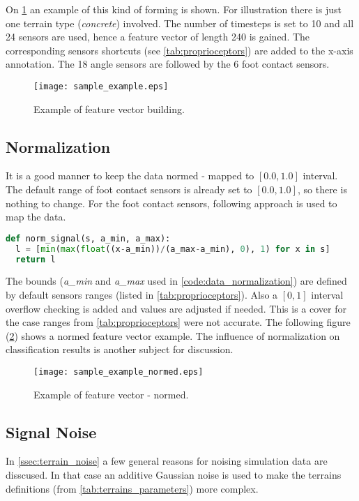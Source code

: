 On \cref{fig:sample_example} an example of this kind of forming is shown. For illustration there is just one terrain type (\textit{concrete}) involved. The number of timesteps is set to 10 and all 24 sensors are used, hence a feature vector of length 240 is gained. The corresponding sensors shortcuts (see \cref{tab:proprioceptors}) are added to the x-axis annotation. The 18 angle sensors are followed by the 6 foot contact sensors.

\begin{figure}[H]
  \centering
  \texttt{[image: sample\_example.eps]}
  \caption{Example of feature vector building.}
  \label{fig:sample_example}
\end{figure}

\subsection{Normalization} \label{ssec:normalization}
It is a good manner to keep the data normed - mapped to $ [0.0, 1.0] $ interval. The default range of foot contact sensors is already set to $ [0.0, 1.0] $, so there is nothing to change. For the foot contact sensors, following approach is used to map the data. 

\begin{lstlisting}[language=Python, caption={Data normalization}, label=code:data_normalization]
def norm_signal(s, a_min, a_max):
  l = [min(max(float((x-a_min))/(a_max-a_min), 0), 1) for x in s]   
  return l
\end{lstlisting}

The bounds (\textit{a\_min} and \textit{a\_max} used in \cref{code:data_normalization}) are defined by default sensors ranges (listed in \cref{tab:proprioceptors}). Also a $ [0, 1] $ interval overflow checking is added and values are adjusted if needed. This is a cover for the case ranges from \cref{tab:proprioceptors} were not accurate. The following figure (\ref{fig:sample_example_normed}) shows a normed feature vector example. The influence of normalization on classification results is another subject for discussion.

\begin{figure}[H]
  \centering
  \texttt{[image: sample\_example\_normed.eps]}
  \caption{Example of feature vector - normed.}
  \label{fig:sample_example_normed}
\end{figure}

\subsection{Signal Noise} \label{ssec:signal_noise}
In \cref{ssec:terrain_noise} a few general reasons for noising simulation data are disscused. In that case an additive Gaussian noise is used to make the terrains definitions (from \cref{tab:terrains_parameters}) more complex.

